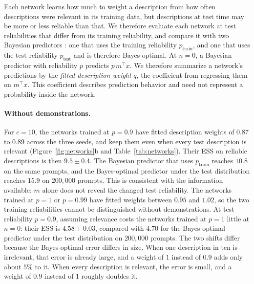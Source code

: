 Each network learns how much to weight a description from how often descriptions were relevant in its training data, but descriptions at test time may be more or less reliable than that. We therefore evaluate each network at test reliabilities that differ from its training reliability, and compare it with two Bayesian predictors \citep{raventos2023}: one that uses the training reliability $p_{\mathrm{train}}$, and one that uses the test reliability $p_{\mathrm{test}}$ and is therefore Bayes-optimal. At $n=0$, a Bayesian predictor with reliability $p$ predicts $p\,m^\top x$. We therefore summarize a network's predictions by the \emph{fitted description weight} $q$, the coefficient from regressing them on $m^\top x$. This coefficient describes prediction behavior and need not represent a probability inside the network.

\paragraph{Without demonstrations.}
For $c = 10$, the networks trained at $p = 0.9$ have fitted description weights of $0.87$ to $0.89$ across the three seeds, and keep them even when every test description is relevant (Figure~\ref{fig:networks}b and Table~\ref{tab:networks}). Their ESS on reliable descriptions is then $9.5 \pm 0.4$. The Bayesian predictor that uses $p_{\mathrm{train}}$ reaches $10.8$ on the same prompts, and the Bayes-optimal predictor under the test distribution reaches $15.9$ on $200{,}000$ prompts. This is consistent with the information available: $m$ alone does not reveal the changed test reliability. The networks trained at $p = 1$ or $p = 0.99$ have fitted weights between $0.95$ and $1.02$, so the two training reliabilities cannot be distinguished without demonstrations. At test reliability $p = 0.9$, assuming relevance costs the networks trained at $p = 1$ little at $n = 0$: their ESS is $4.58 \pm 0.03$, compared with $4.70$ for the Bayes-optimal predictor under the test distribution on $200{,}000$ prompts. The two shifts differ because the Bayes-optimal error differs in size. When one description in ten is irrelevant, that error is already large, and a weight of $1$ instead of $0.9$ adds only about $5\%$ to it. When every description is relevant, the error is small, and a weight of $0.9$ instead of $1$ roughly doubles it.

